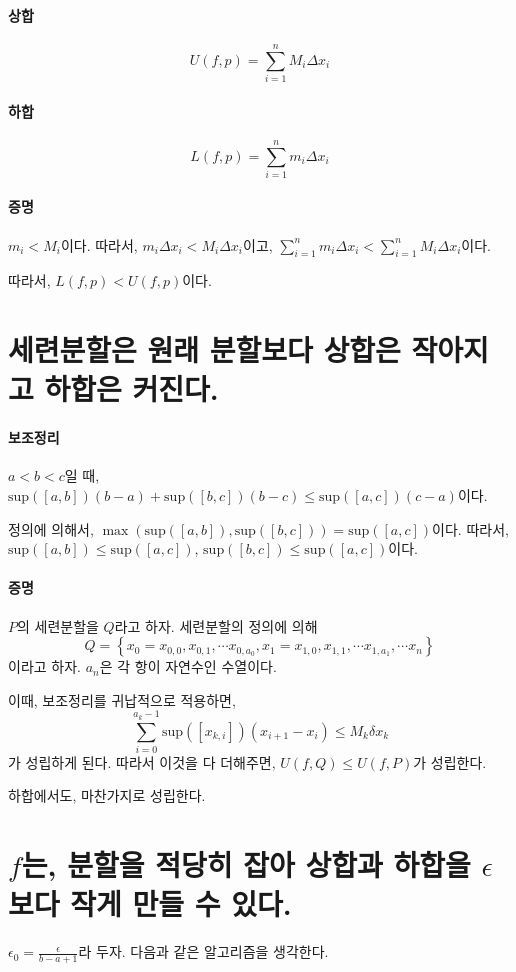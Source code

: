 \paragraph{상합} $$U(f,p) = \sum_{i=1}^n M_i \Delta x_i$$
\paragraph{하합} $$L(f,p) = \sum_{i=1}^n m_i \Delta x_i$$

\paragraph{증명}
$m_i < M_i$이다. 따라서, $m_i  \Delta x_i <  M_i \Delta x_i$이고, $\sum_{i=1}^n m_i \Delta x_i < \sum_{i=1}^n M_i \Delta x_i$이다.

따라서, $L(f,p) < U(f,p)$이다.


\section{세련분할은 원래 분할보다 상합은 작아지고 하합은 커진다.} \label{chap:hahapre}

\paragraph{보조정리} $a<b<c$일 때, $\mathrm{sup}([a,b])(b-a) + \mathrm{sup}([b,c])(b-c) \le \mathrm{sup}([a,c])(c-a)$이다.

정의에 의해서, $\max(\mathrm{sup}([a,b]), \mathrm{sup}([b,c])) = \mathrm{sup}([a,c])$이다. 따라서, $\mathrm{sup}([a,b]) \le \mathrm{sup}([a,c]) $, $\mathrm{sup}([b,c]) \le \mathrm{sup}([a,c]) $이다.


\paragraph{증명} $P$의 세련분할을 $Q$라고 하자. 세련분할의 정의에 의해 $$Q = \left\{ x_0=x_{0,0}, x_{0,1}, \cdots x_{0,a_0}, x_1=x_{1,0}, x_{1,1}, \cdots x_{1,a_1}, \cdots x_n \right\}$$이라고 하자. $a_n$은 각 항이 자연수인 수열이다.

이때, 보조정리를 귀납적으로 적용하면, $$\sum_{i=0}^{a_k-1} \mathrm{sup}([x_{k,i}]) (x_{i+1}-x_{i}) \le M_k \delta x_k$$가 성립하게 된다.
따라서 이것을 다 더해주면, $U(f,Q) \le U(f,P)$가 성립한다. 

하합에서도, 마찬가지로 성립한다.




\section{$f$는, 분할을 적당히 잡아 상합과 하합을 $\epsilon$보다 작게 만들 수 있다.} \label{chap:hahap}
$\epsilon_0 = \frac{\epsilon}{b-a+1}$라 두자.
다음과 같은 알고리즘을 생각한다.

